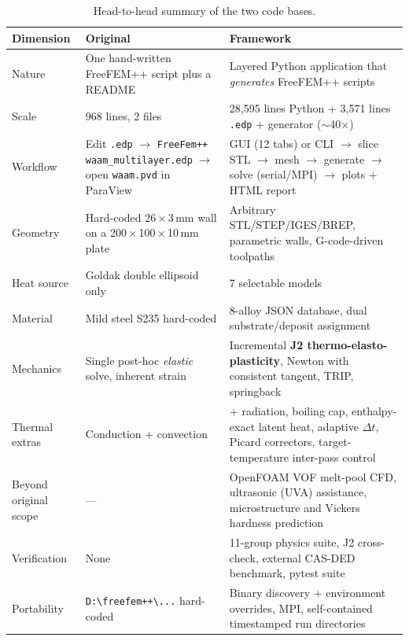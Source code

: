 \documentclass[10pt,a4paper]{article}
\newcommand{\code}[1]{\texttt{#1}}
\begin{document}
\begin{table}[h!]
\centering
\caption{Head-to-head summary of the two code bases.}
\label{tab:summary}
\small
\begin{tabularx}{\linewidth}{@{}l X X@{}}
\toprule
\textbf{Dimension} & \textbf{Original} & \textbf{Framework} \\
\midrule
Nature & One hand-written FreeFEM++ script plus a README &
Layered Python application that \emph{generates} FreeFEM++ scripts \\
\addlinespace
Scale & 968 lines, 2 files & 28{,}595 lines Python + 3{,}571 lines
\code{.edp} + generator ($\sim$40$\times$) \\
\addlinespace
Workflow & Edit \code{.edp} $\rightarrow$ \code{FreeFem++ waam\_multilayer.edp}
$\rightarrow$ open \code{waam.pvd} in ParaView &
GUI (12 tabs) or CLI $\rightarrow$ slice STL $\rightarrow$ mesh $\rightarrow$
generate $\rightarrow$ solve (serial/MPI) $\rightarrow$ plots + HTML report \\
\addlinespace
Geometry & Hard-coded 26\,$\times$\,3\,mm wall on a
200\,$\times$\,100\,$\times$\,10\,mm plate &
Arbitrary STL/STEP/IGES/BREP, parametric walls, G-code-driven toolpaths \\
\addlinespace
Heat source & Goldak double ellipsoid only & 7 selectable models \\
\addlinespace
Material & Mild steel S235 hard-coded & 8-alloy JSON database, dual
substrate/deposit assignment \\
\addlinespace
Mechanics & Single post-hoc \emph{elastic} solve, inherent strain &
Incremental \textbf{J2 thermo-elasto-plasticity}, Newton with consistent
tangent, TRIP, springback \\
\addlinespace
Thermal extras & Conduction + convection & + radiation, boiling cap,
enthalpy-exact latent heat, adaptive $\Delta t$, Picard correctors,
target-temperature inter-pass control \\
\addlinespace
Beyond original scope & --- & OpenFOAM VOF melt-pool CFD, ultrasonic (UVA)
assistance, microstructure and Vickers hardness prediction \\
\addlinespace
Verification & None & 11-group physics suite, J2 cross-check, external
CAS-DED benchmark, pytest suite \\
\addlinespace
Portability & \code{D:\textbackslash freefem++\textbackslash...} hard-coded &
Binary discovery + environment overrides, MPI, self-contained timestamped run
directories \\
\bottomrule
\end{tabularx}
\end{table}
\end{document}
